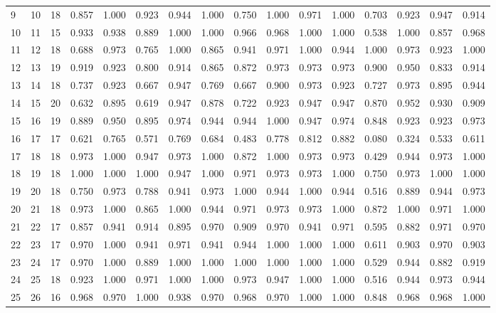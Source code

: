 \begin{longtable}{lrllllllllllllll}
9 & 10 & 18 & 0.857 & 1.000 & 0.923 & 0.944 & 1.000 & 0.750 & 1.000 & 0.971 & 1.000 & 0.703 & 0.923 & 0.947 & 0.914 \\
10 & 11 & 15 & 0.933 & 0.938 & 0.889 & 1.000 & 1.000 & 0.966 & 0.968 & 1.000 & 1.000 & 0.538 & 1.000 & 0.857 & 0.968 \\
11 & 12 & 18 & 0.688 & 0.973 & 0.765 & 1.000 & 0.865 & 0.941 & 0.971 & 1.000 & 0.944 & 1.000 & 0.973 & 0.923 & 1.000 \\
12 & 13 & 19 & 0.919 & 0.923 & 0.800 & 0.914 & 0.865 & 0.872 & 0.973 & 0.973 & 0.973 & 0.900 & 0.950 & 0.833 & 0.914 \\
13 & 14 & 18 & 0.737 & 0.923 & 0.667 & 0.947 & 0.769 & 0.667 & 0.900 & 0.973 & 0.923 & 0.727 & 0.973 & 0.895 & 0.944 \\
14 & 15 & 20 & 0.632 & 0.895 & 0.619 & 0.947 & 0.878 & 0.722 & 0.923 & 0.947 & 0.947 & 0.870 & 0.952 & 0.930 & 0.909 \\
15 & 16 & 19 & 0.889 & 0.950 & 0.895 & 0.974 & 0.944 & 0.944 & 1.000 & 0.947 & 0.974 & 0.848 & 0.923 & 0.923 & 0.973 \\
16 & 17 & 17 & 0.621 & 0.765 & 0.571 & 0.769 & 0.684 & 0.483 & 0.778 & 0.812 & 0.882 & 0.080 & 0.324 & 0.533 & 0.611 \\
17 & 18 & 18 & 0.973 & 1.000 & 0.947 & 0.973 & 1.000 & 0.872 & 1.000 & 0.973 & 0.973 & 0.429 & 0.944 & 0.973 & 1.000 \\
18 & 19 & 18 & 1.000 & 1.000 & 1.000 & 0.947 & 1.000 & 0.971 & 0.973 & 0.973 & 1.000 & 0.750 & 0.973 & 1.000 & 1.000 \\
19 & 20 & 18 & 0.750 & 0.973 & 0.788 & 0.941 & 0.973 & 1.000 & 0.944 & 1.000 & 0.944 & 0.516 & 0.889 & 0.944 & 0.973 \\
20 & 21 & 18 & 0.973 & 1.000 & 0.865 & 1.000 & 0.944 & 0.971 & 0.973 & 0.973 & 1.000 & 0.872 & 1.000 & 0.971 & 1.000 \\
21 & 22 & 17 & 0.857 & 0.941 & 0.914 & 0.895 & 0.970 & 0.909 & 0.970 & 0.941 & 0.971 & 0.595 & 0.882 & 0.971 & 0.970 \\
22 & 23 & 17 & 0.970 & 1.000 & 0.941 & 0.971 & 0.941 & 0.944 & 1.000 & 1.000 & 1.000 & 0.611 & 0.903 & 0.970 & 0.903 \\
23 & 24 & 17 & 0.970 & 1.000 & 0.889 & 1.000 & 1.000 & 1.000 & 1.000 & 1.000 & 1.000 & 0.529 & 0.944 & 0.882 & 0.919 \\
24 & 25 & 18 & 0.923 & 1.000 & 0.971 & 1.000 & 1.000 & 0.973 & 0.947 & 1.000 & 1.000 & 0.516 & 0.944 & 0.973 & 0.944 \\
25 & 26 & 16 & 0.968 & 0.970 & 1.000 & 0.938 & 0.970 & 0.968 & 0.970 & 1.000 & 1.000 & 0.848 & 0.968 & 0.968 & 1.000 \\

\end{longtable}

